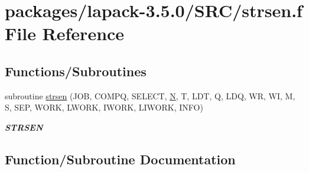 \hypertarget{strsen_8f}{}\section{packages/lapack-\/3.5.0/\+S\+R\+C/strsen.f File Reference}
\label{strsen_8f}
\subsection*{Functions/\+Subroutines}
\begin{DoxyCompactItemize}
\item 
subroutine \hyperlink{strsen_8f_ae6c2fe7fae83de30b074b968aa459f73}{strsen} (J\+O\+B, C\+O\+M\+P\+Q, S\+E\+L\+E\+C\+T, \hyperlink{polmisc_8c_a0240ac851181b84ac374872dc5434ee4}{N}, T, L\+D\+T, Q, L\+D\+Q, W\+R, W\+I, M, S, S\+E\+P, W\+O\+R\+K, L\+W\+O\+R\+K, I\+W\+O\+R\+K, L\+I\+W\+O\+R\+K, I\+N\+F\+O)
\begin{DoxyCompactList}\small\item\em {\bfseries S\+T\+R\+S\+E\+N} \end{DoxyCompactList}\end{DoxyCompactItemize}


\subsection{Function/\+Subroutine Documentation}
\hypertarget{strsen_8f_ae6c2fe7fae83de30b074b968aa459f73}{}
